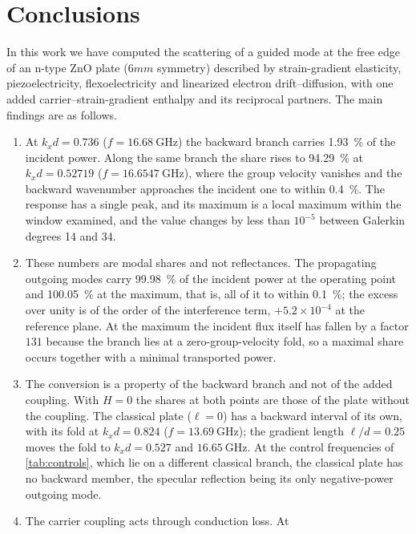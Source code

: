 \section{Conclusions}
\label{sec:conclusions}

In this work we have computed the scattering of a guided mode at the free edge of
an n-type ZnO plate ($6mm$ symmetry) described by strain-gradient elasticity,
piezoelectricity, flexoelectricity and linearized electron drift--diffusion, with
one added carrier--strain-gradient enthalpy and its reciprocal partners.  The main
findings are as follows.

\begin{enumerate}
\item At $k_xd=0.736$ ($f=\SI{16.68}{\giga\hertz}$) the backward branch carries
\SI{1.93}{\percent} of the incident power.  Along the same branch the share rises
to \SI{94.29}{\percent} at $k_xd=0.52719$ ($f=\SI{16.6547}{\giga\hertz}$), where the
group velocity vanishes and the backward wavenumber approaches the incident one to
within \SI{0.4}{\percent}.  The response has a single peak, and its maximum is a local maximum within the window examined, and the value changes by less than $10^{-5}$
between Galerkin degrees 14 and 34.
\item These numbers are modal shares and not reflectances.  The propagating
outgoing modes carry \SI{99.98}{\percent} of the incident power at the operating
point and \SI{100.05}{\percent} at the maximum, that is, all of it to within
\SI{0.1}{\percent}; the excess over unity is of the order of the interference term, $+5.2\times10^{-4}$ at the reference plane.  At the maximum the incident flux itself has fallen by a factor
$131$ because the branch lies at a zero-group-velocity fold, so a maximal share occurs together with a minimal transported power.
\item The conversion is a property of the backward branch and not of the added
coupling.  With $H=0$ the shares at both points are those of the plate without the
coupling.  The classical plate ($\ell=0$) has a backward interval of its own, with
its fold at $k_xd=0.824$ ($f=\SI{13.69}{\giga\hertz}$); the gradient length
$\ell/d=0.25$ moves the fold to $k_xd=0.527$ and $\SI{16.65}{\giga\hertz}$.  At the
control frequencies of \cref{tab:controls}, which lie on a different classical branch, the classical plate has no backward member, the specular
reflection being its only negative-power outgoing mode.
\item The carrier coupling acts through conduction loss.  At

\end{enumerate}
